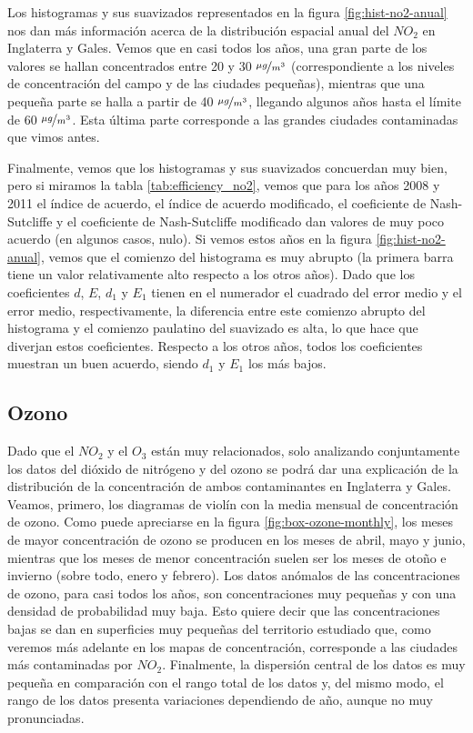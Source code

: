 \documentclass[12pt]{article}
\begin{document}
Los histogramas y sus suavizados representados en la figura \ref{fig:hist-no2-anual} nos dan más información acerca de la distribución espacial anual del $NO_{2}$ en Inglaterra y Gales. Vemos que en casi todos los años, una gran parte de los valores se hallan concentrados entre 20 y 30 $\nicefrac{\mu g}{m^{3}}$ (correspondiente a los niveles de concentración del campo y de las ciudades pequeñas), mientras que una pequeña parte se halla a partir de 40 $\nicefrac{\mu g}{m^{3}}$, llegando algunos años hasta el límite de 60 $\nicefrac{\mu g}{m^{3}}$. Esta última parte corresponde a las grandes ciudades contaminadas que vimos antes.

Finalmente, vemos que los histogramas y sus suavizados concuerdan muy bien, pero si miramos la tabla \ref{tab:efficiency_no2}, vemos que para los años 2008 y 2011 el índice de acuerdo, el índice de acuerdo modificado, el coeficiente de Nash-Sutcliffe y el coeficiente de Nash-Sutcliffe modificado dan valores de muy poco acuerdo (en algunos casos, nulo). Si vemos estos años en la figura \ref{fig:hist-no2-anual}, vemos que el comienzo del histograma es muy abrupto (la primera barra tiene un valor relativamente alto respecto a los otros años). Dado que los coeficientes $d$, $E$, $d_{1}$ y $E_{1}$ tienen en el numerador el cuadrado del error medio y el error medio, respectivamente, la diferencia entre este comienzo abrupto del histograma y el comienzo paulatino del suavizado es alta, lo que hace que diverjan estos coeficientes. Respecto a los otros años, todos los coeficientes muestran un buen acuerdo, siendo $d_{1}$ y $E_{1}$ los más bajos.

\subsection{Ozono}

Dado que el $NO_{2}$ y el $O_{3}$ están muy relacionados, solo analizando conjuntamente los datos del dióxido de nitrógeno y del ozono se podrá dar una explicación de la distribución de la concentración de ambos contaminantes en Inglaterra y Gales. Veamos, primero, los diagramas de violín con la media mensual de concentración de ozono. Como puede apreciarse en la figura \ref{fig:box-ozone-monthly}, los meses de mayor concentración de ozono se producen en los meses de abril, mayo y junio, mientras que los meses de menor concentración suelen ser los meses de otoño e invierno (sobre todo, enero y febrero). Los datos anómalos de las concentraciones de ozono, para casi todos los años, son concentraciones muy pequeñas y con una densidad de probabilidad muy baja. Esto quiere decir que las concentraciones bajas se dan en superficies muy pequeñas del territorio estudiado que, como veremos más adelante en los mapas de concentración, corresponde a las ciudades más contaminadas por $NO_{2}$. Finalmente, la dispersión central de los datos es muy pequeña en comparación con el rango total de los datos y, del mismo modo, el rango de los datos presenta variaciones dependiendo de año, aunque no muy pronunciadas.
\end{document}
